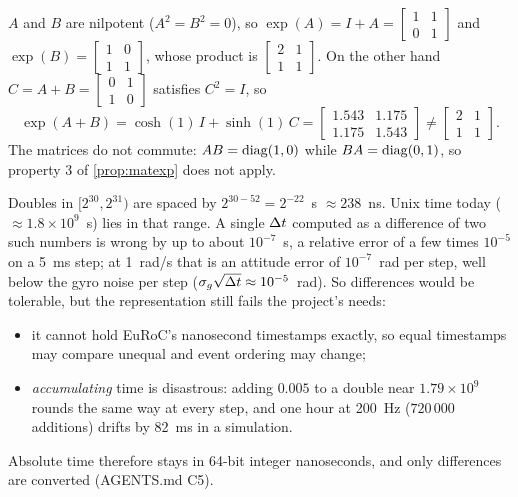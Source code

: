 \begin{solutions}
  \item $A$ and $B$ are nilpotent ($A^2 = B^2 = 0$), so $\exp(A) = I + A = \begin{bmatrix}1 & 1\\0 & 1\end{bmatrix}$ and
        $\exp(B) = \begin{bmatrix}1 & 0\\1 & 1\end{bmatrix}$, whose product is $\begin{bmatrix}2 & 1\\ 1 & 1\end{bmatrix}$. On the other hand
        $C = A + B = \begin{bmatrix}0 & 1\\1 & 0\end{bmatrix}$ satisfies $C^2 = I$, so
        \[
          \exp(A + B) = \cosh(1)\,I + \sinh(1)\,C = \begin{bmatrix}1.543 & 1.175\\ 1.175 & 1.543\end{bmatrix} \ne \begin{bmatrix}2 & 1\\ 1 & 1\end{bmatrix}.
        \]
        The matrices do not commute: $AB = \operatorname{diag}(1, 0)$ while $BA = \operatorname{diag}(0, 1)$, so property 3 of \cref{prop:matexp} does not apply.

  \item Doubles in $[2^{30}, 2^{31})$ are spaced by $2^{30-52} = 2^{-22}$~s $\approx 238$~ns. Unix time today ($\approx 1.8\times10^9$~s) lies in that
        range. A single ${\Delta t}$ computed as a difference of two such numbers is wrong by up to about $10^{-7}$~s, a relative error of a few
        times $10^{-5}$ on a 5~ms step; at 1~rad/s that is an attitude error of $10^{-7}$~rad per step, well below the gyro noise per step
        ($\sigma_g\sqrt{{\Delta t}} \approx 10^{-5}$~rad). So differences would be tolerable, but the representation still fails the project's needs:
        \begin{itemize}[leftmargin=1.2em]
          \item it cannot hold EuRoC's nanosecond timestamps exactly, so equal timestamps may compare unequal and event ordering may change;
          \item \emph{accumulating} time is disastrous: adding $0.005$ to a double near $1.79\times10^9$ rounds the same way at every step, and one
                hour at 200~Hz ($720\,000$ additions) drifts by 82~ms in a simulation.
        \end{itemize}
        Absolute time therefore stays in 64-bit integer nanoseconds, and only differences are converted (AGENTS.md C5).


\end{solutions}
